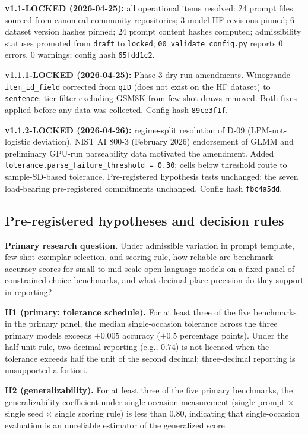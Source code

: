 \documentclass[11pt]{article}
\begin{document}
\textbf{v1.1-LOCKED (2026-04-25):} all operational items resolved: 24 prompt files sourced from canonical community repositories; 3 model HF revisions pinned; 6 dataset version hashes pinned; 24 prompt content hashes computed; admissibility statuses promoted from \texttt{draft} to \texttt{locked}; \texttt{00\_validate\_config.py} reports 0 errors, 0 warnings; config hash \texttt{65fdd1c2}.

\textbf{v1.1.1-LOCKED (2026-04-25):} Phase 3 dry-run amendments. Winogrande \texttt{item\_id\_field} corrected from \texttt{qID} (does not exist on the HF dataset) to \texttt{sentence}; tier filter excluding GSM8K from few-shot draws removed. Both fixes applied before any data was collected. Config hash \texttt{89ce3f1f}.

\textbf{v1.1.2-LOCKED (2026-04-26):} regime-split resolution of D-09 (LPM-not-logistic deviation). NIST AI 800-3 (February 2026) endorsement of GLMM and preliminary GPU-run parseability data motivated the amendment. Added \texttt{tolerance.parse\_failure\_threshold = 0.30}; cells below threshold route to sample-SD-based tolerance. Pre-registered hypothesis tests unchanged; the seven load-bearing pre-registered commitments unchanged. Config hash \texttt{fbc4a5dd}.

\subsection{Pre-registered hypotheses and decision rules}
\label{app:prereg-hypotheses}

\textbf{Primary research question.} Under admissible variation in prompt template, few-shot exemplar selection, and scoring rule, how reliable are benchmark accuracy scores for small-to-mid-scale open language models on a fixed panel of constrained-choice benchmarks, and what decimal-place precision do they support in reporting?

\textbf{H1 (primary; tolerance schedule).} For at least three of the five benchmarks in the primary panel, the median single-occasion tolerance across the three primary models exceeds $\pm 0.005$ accuracy ($\pm 0.5$ percentage points). Under the half-unit rule, two-decimal reporting (e.g., $0.74$) is not licensed when the tolerance exceeds half the unit of the second decimal; three-decimal reporting is unsupported a fortiori.

\textbf{H2 (generalizability).} For at least three of the five primary benchmarks, the generalizability coefficient under single-occasion measurement (single prompt $\times$ single seed $\times$ single scoring rule) is less than $0.80$, indicating that single-occasion evaluation is an unreliable estimator of the generalized score.
\end{document}
